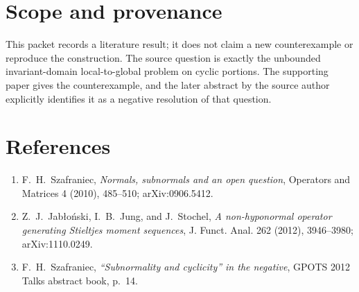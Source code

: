 \documentclass[11pt]{article}
\begin{document}
\section*{Scope and provenance}

This packet records a literature result; it does not claim a new
counterexample or reproduce the construction.  The source question is exactly
the unbounded invariant-domain local-to-global problem on cyclic portions.
The supporting paper gives the counterexample, and the later abstract by the
source author explicitly identifies it as a negative resolution of that
question.

\section*{References}

\begin{enumerate}
\item F.\ H.\ Szafraniec,
\emph{Normals, subnormals and an open question},
Operators and Matrices 4 (2010), 485--510; arXiv:0906.5412.

\item Z.\ J.\ Jab{\l}o{\'n}ski, I.\ B.\ Jung, and J.\ Stochel,
\emph{A non-hyponormal operator generating Stieltjes moment sequences},
J. Funct. Anal. 262 (2012), 3946--3980; arXiv:1110.0249.

\item F.\ H.\ Szafraniec,
\emph{“Subnormality and cyclicity” in the negative},
GPOTS 2012 Talks abstract book, p.\ 14.
\end{enumerate}
\end{document}
